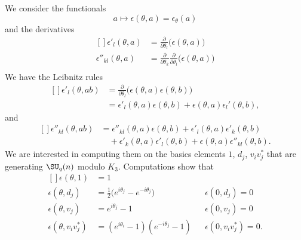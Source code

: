 We consider the functionals
\begin{equation}
	a\mapsto\epsilon(\theta,a)=\epsilon_{\theta}(a)
\end{equation}
and the derivatives
\begin{equation}
	\begin{aligned}[]
		\epsilon'_l(\theta,a)     & =\frac{ \partial  }{ \partial \theta_l }\big( \epsilon(\theta,a) \big)                                        \\
		\epsilon''_{kl}(\theta,a) & =\frac{ \partial  }{ \partial \theta_k }\frac{ \partial  }{ \partial \theta_l }\big( \epsilon(\theta,a) \big) \\
	\end{aligned}
\end{equation}
We have the Leibnitz rules
\begin{equation}
	\begin{aligned}[]
		\epsilon'_l(\theta,ab) & =\frac{ \partial  }{ \partial \theta_l }\big( \epsilon(\theta,a)\epsilon(\theta,b) \big) \\
		                       & =\epsilon'_l(\theta,a)\epsilon(\theta,b)+\epsilon(\theta,a)\epsilon_l'(\theta,b),
	\end{aligned}
\end{equation}
and
\begin{equation}        \label{EqLeibnitzepsppkl}
	\begin{aligned}[]
		\epsilon''_{kl}(\theta,ab) & =\epsilon''_{kl}(\theta,a)\epsilon(\theta,b)+\epsilon'_l(\theta,a)\epsilon'_k(\theta,b)       \\
		                           & \quad+\epsilon'_k(\theta,a)\epsilon'_l(\theta,b)+\epsilon(\theta,a)\epsilon''_{kl}(\theta,b).
	\end{aligned}
\end{equation}
We are interested in computing them on the basics elements $1$, $d_j$, $v_iv_j^*$ that are generating $\SU_q(n)$ modulo $K_3$. Computations show that
\begin{equation}
	\begin{aligned}[]
		\epsilon(\theta,1)        & =1                                                                                    \\
		\epsilon(\theta,d_j)      & =\frac{ 1 }{2}\big(  e^{i\theta_j}- e^{-i\theta_j} \big) &  & \epsilon(0,d_j)=0       \\
		\epsilon(\theta,v_j)      & = e^{i\theta_j}-1                                        &  & \epsilon(0,v_j)=0       \\
		\epsilon(\theta,v_iv_j^*) & =( e^{i\theta_i}-1)( e^{-i\theta_j}-1)                   &  & \epsilon(0,v_iv_j^*)=0.
	\end{aligned}
\end{equation}
